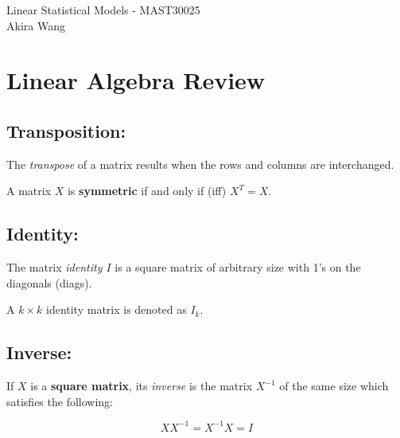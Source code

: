 \documentclass[12pt]{article}
\begin{document}
\begin{center}
    Linear Statistical Models - MAST30025 \\
    Akira Wang
\end{center}

\section{Linear Algebra Review}

\subsection{Transposition:}  
The \textit{transpose} of a matrix results when the rows and columns are interchanged. 

A matrix $X$ is \textbf{symmetric} if and only if (iff) $X^T = X$.


\subsection{Identity:}

The matrix \textit{identity $I$} is a square matrix of arbitrary size with 1's on the diagonals (diags).

A $k\times k$ identity matrix is denoted as $I_k$.

\subsection{Inverse:}

If $X$ is a \textbf{square matrix}, its \textit{inverse} is the matrix $X^{-1}$ of the same size which satisfies the following:

\begin{equation}
    XX^{-1} = X^{-1}X = I
\end{equation}

\end{document}
